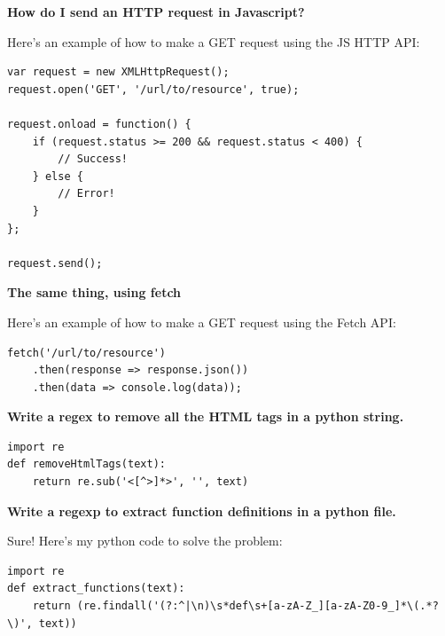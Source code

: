 \documentclass[11pt]{article}
\begin{document}
\begin{framed}
\centering
\vspace{.5em}
\begin{minipage}{.9\textwidth}
\textbf{How do I send an HTTP request in Javascript?}

\vspace{1em}

Here’s an example of how to make a GET request using the JS HTTP API:
\begin{lstlisting}
var request = new XMLHttpRequest();
request.open('GET', '/url/to/resource', true);

request.onload = function() {
    if (request.status >= 200 && request.status < 400) {
        // Success!
    } else {
        // Error!
    }
};

request.send();
\end{lstlisting}
\vspace{1em}
\textbf{The same thing, using fetch}
\vspace{1em}

Here’s an example of how to make a GET request using the Fetch API:
\begin{lstlisting}
fetch('/url/to/resource')
    .then(response => response.json())
    .then(data => console.log(data));
\end{lstlisting}

\end{minipage}
\vspace{.5em}
\end{framed}
% 

\begin{framed}
\centering
\vspace{.5em}
\begin{minipage}{.9\textwidth}
\textbf{Write a regex to remove all the HTML tags in a python string. }

\begin{lstlisting}
import re
def removeHtmlTags(text):
    return re.sub('<[^>]*>', '', text)
\end{lstlisting}


\textbf{Write a regexp to extract function definitions in a python file.}

Sure! Here's my python code to solve the problem:
\begin{lstlisting}
import re
def extract_functions(text):
    return (re.findall('(?:^|\n)\s*def\s+[a-zA-Z_][a-zA-Z0-9_]*\(.*?\)', text))
\end{lstlisting}

\end{minipage}
\vspace{.5em}
\end{framed}
\end{document}
